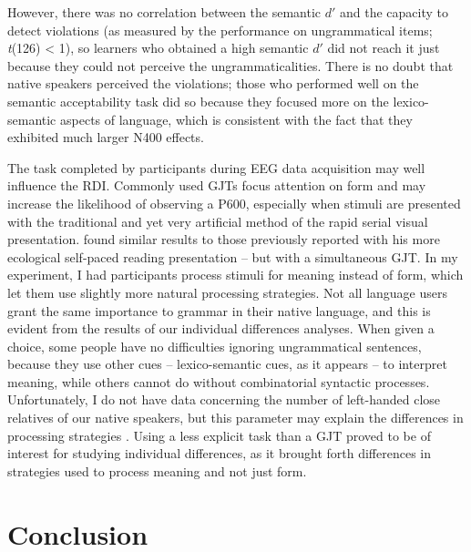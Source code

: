 \documentclass[output=paper,colorlinks,citecolor=brown,modfonts,nonflat]{../langscibook}
\begin{document}
However, there was no correlation between the semantic $d′$ and the capacity to detect violations (as measured by the performance on ungrammatical items; \textit{t}(126) < 1), so learners who obtained a high semantic $d′$ did not reach it just because they could not perceive the ungrammaticalities. There is no doubt that native speakers perceived the violations; those who performed well on the semantic acceptability task did so because they focused more on the lexico-semantic aspects of language, which is consistent with the fact that they exhibited much larger N400 effects.

The task completed by participants during EEG data acquisition may well influence the RDI. Commonly used GJTs focus attention on form and may increase the likelihood of observing a P600, especially when stimuli are presented with the traditional and yet very artificial method of the rapid serial visual presentation. \citet{Tanner2019} found similar results to those previously reported with his more ecological self-paced reading presentation – but with a simultaneous GJT. In my experiment, I had participants process stimuli for meaning instead of form, which let them use slightly more natural processing strategies. Not all language users grant the same importance to grammar in their native language, and this is evident from the results of our individual differences analyses. When given a choice, some people have no difficulties ignoring ungrammatical sentences, because they use other cues – lexico-semantic cues, as it appears – to interpret meaning, while others cannot do without combinatorial syntactic processes. Unfortunately, I do not have data concerning the number of left-handed close relatives of our native speakers, but this parameter may explain the differences in processing strategies \citep{GreyEtAl2017}. Using a less explicit task than a GJT proved to be of interest for studying individual differences, as it brought forth differences in strategies used to process meaning and not just form. 

\section{Conclusion}
\end{document}
